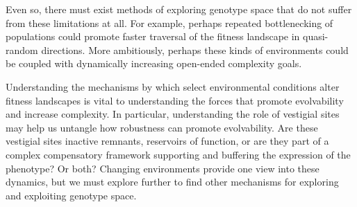 \documentclass[PhD]{msu-thesis}
\begin{document}
Even so, there must exist methods of exploring genotype space that do not suffer from these limitations at all.
For example, perhaps repeated bottlenecking of populations could promote faster traversal of the fitness landscape in quasi-random directions. More ambitiously, perhaps these kinds of environments could be coupled with dynamically increasing open-ended complexity goals.

Understanding the mechanisms by which select environmental conditions alter fitness landscapes is vital to understanding the forces that promote evolvability and increase complexity. In particular, understanding the role of vestigial sites may help us untangle how robustness can promote evolvability. Are these vestigial sites inactive remnants, reservoirs of function, or are they part of a complex compensatory framework supporting and buffering the expression of the phenotype? Or both? Changing environments provide one view into these dynamics, but we must explore further to find other mechanisms for exploring and exploiting genotype space.
\end{document}

